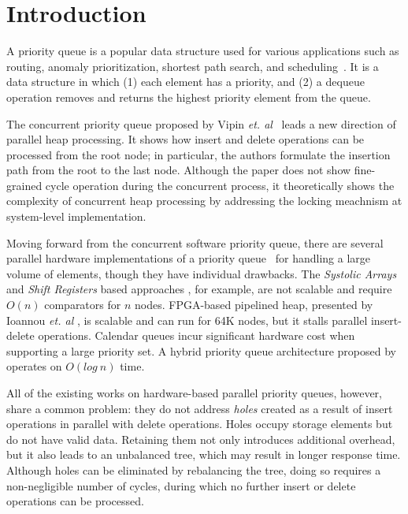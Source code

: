\section{Introduction}
A priority queue is a popular data structure used for various applications such as routing, anomaly prioritization, shortest path search, and scheduling~\cite{ah1,ah2,ah3}.
It is a data structure in which (1) each element has a priority, and (2) a dequeue operation removes and returns the highest priority element from the queue.

The concurrent priority queue proposed by Vipin {\it et. al}~\cite{pq6} leads a new direction of parallel heap processing. 
It shows how insert and delete operations can be processed from the root node; in particular, the authors formulate the insertion path from the root to the last node. 
Although the paper does not show fine-grained cycle operation during the concurrent process, it theoretically shows the complexity of concurrent heap processing by addressing the locking meachnism at system-level implementation.

Moving forward from the concurrent software priority queue, there are several parallel hardware implementations of a priority queue~\cite{hw1,hw2,hw8,hw9,fpga1,fpga2,fpga3} for handling a large volume of elements, though they have individual drawbacks.
The {\it Systolic Arrays} and {\it Shift Registers} based approaches \cite{hw8,hw9}, for example, are not scalable and require $O(n)$ comparators for $n$ nodes.
FPGA-based pipelined heap, presented by Ioannou {\it et. al} \cite{fpga1}, is scalable and can run for 64K nodes, but it stalls parallel insert-delete operations. Calendar queues \cite{hw1} incur significant hardware cost when supporting a large priority set. A hybrid priority queue architecture proposed by \cite{hwsw1} operates on $O(log \ n)$ time.

All of the existing works on hardware-based parallel priority queues, however, share a common problem: they do not address {\it holes} created as a result of insert operations in parallel with delete operations. 
Holes occupy storage elements but do not have valid data. 
Retaining them not only introduces additional overhead, but it also leads to an unbalanced tree, which may result in longer response time.
Although holes can be eliminated by rebalancing the tree, doing so requires a non-negligible number of cycles, during which no further insert or delete operations can be processed.

